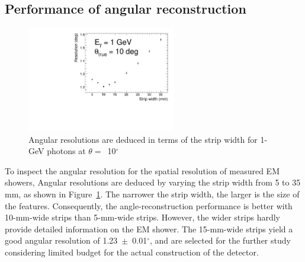 \documentclass[12pt,times,draftclsnofoot,a4paper]{elsarticle}
\begin{document}
\subsection{Performance of angular reconstruction}
\label{sec:perf}

\begin{figure}[!hbt]
\centering
\includegraphics[width=0.58\textwidth]{Fig5_width_including7.5_12.5mm.pdf}
\caption{ Angular resolutions are deduced in terms of the strip width for 1-GeV photons at $\theta=$~10$^{\circ}$ }
\label{fig:angle_reco_width}
\end{figure}

To inspect the angular resolution for the spatial resolution of measured EM showers,  %
Angular resolutions are deduced by varying the strip width from 5 to 35 mm, as shown in Figure~\ref{fig:angle_reco_width}. The narrower the strip width, the larger is the size of the features. Consequently, the angle-reconstruction performance is better with 10-mm-wide strips than 5-mm-wide strips. However, the wider strips hardly provide detailed information on the EM shower. The 15-mm-wide strips yield a good angular resolution of 1.23~$\pm$~0.01$^{\circ}$,
and are selected for the further study considering limited budget for the actual construction of the detector.   %
\end{document}
